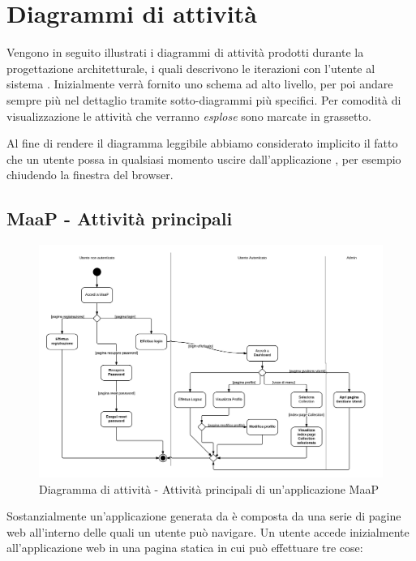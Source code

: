 \section{Diagrammi di attività}

Vengono in seguito illustrati i diagrammi di attività prodotti durante la progettazione architetturale, i quali descrivono le iterazioni con l'utente al sistema . Inizialmente verrà fornito uno schema ad alto livello, per poi andare sempre più nel dettaglio tramite sotto-diagrammi più specifici. Per comodità di visualizzazione le attività che verranno \textit{esplose} sono marcate in grassetto. 

Al fine di rendere il diagramma leggibile abbiamo considerato implicito il fatto che un utente possa in qualsiasi momento uscire dall'applicazione , per esempio chiudendo la finestra del browser.

\subsection{}

\subsection{MaaP - Attività principali}

\begin{figure}[H]
\centering
\includegraphics[scale=0.12]{uml/MaaP - Attivita Principali.png}
\caption{Diagramma di attività - Attività principali di un'applicazione MaaP}
\end{figure}

Sostanzialmente un'applicazione generata da  è composta da una serie di pagine web all'interno delle quali un utente può navigare. Un utente accede inizialmente all'applicazione web in una pagina statica in cui può effettuare tre cose:

